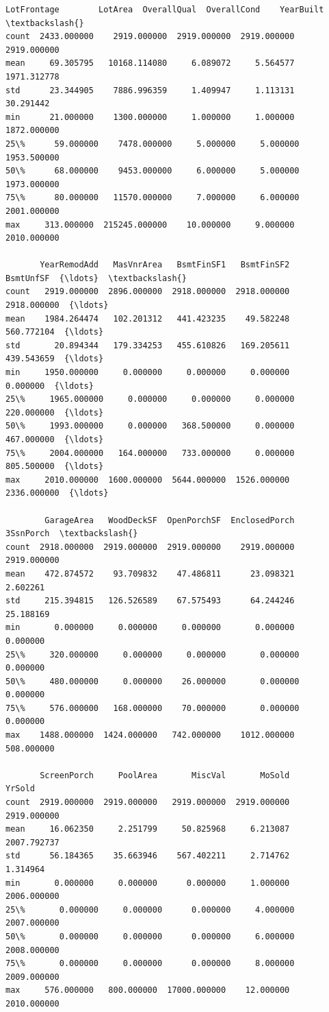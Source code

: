 \documentclass[11pt]{article}
\makeatletter
\newcommand{\boxspacing}{\kern\kvtcb@left@rule\kern\kvtcb@boxsep}
\newcommand{\prompt}[4]{
        \ttfamily\llap{{\color{#2}[#3]:\hspace{3pt}#4}}\vspace{-\baselineskip}
    }
\makeatother
\begin{document}
            \begin{tcolorbox}[breakable, size=fbox, boxrule=.5pt, pad at break*=1mm, opacityfill=0]
\prompt{Out}{outcolor}{349}{\boxspacing}
\begin{Verbatim}[commandchars=\\\{\}]
       LotFrontage        LotArea  OverallQual  OverallCond    YearBuilt  \textbackslash{}
count  2433.000000    2919.000000  2919.000000  2919.000000  2919.000000
mean     69.305795   10168.114080     6.089072     5.564577  1971.312778
std      23.344905    7886.996359     1.409947     1.113131    30.291442
min      21.000000    1300.000000     1.000000     1.000000  1872.000000
25\%      59.000000    7478.000000     5.000000     5.000000  1953.500000
50\%      68.000000    9453.000000     6.000000     5.000000  1973.000000
75\%      80.000000   11570.000000     7.000000     6.000000  2001.000000
max     313.000000  215245.000000    10.000000     9.000000  2010.000000

       YearRemodAdd   MasVnrArea   BsmtFinSF1   BsmtFinSF2    BsmtUnfSF  {\ldots}  \textbackslash{}
count   2919.000000  2896.000000  2918.000000  2918.000000  2918.000000  {\ldots}
mean    1984.264474   102.201312   441.423235    49.582248   560.772104  {\ldots}
std       20.894344   179.334253   455.610826   169.205611   439.543659  {\ldots}
min     1950.000000     0.000000     0.000000     0.000000     0.000000  {\ldots}
25\%     1965.000000     0.000000     0.000000     0.000000   220.000000  {\ldots}
50\%     1993.000000     0.000000   368.500000     0.000000   467.000000  {\ldots}
75\%     2004.000000   164.000000   733.000000     0.000000   805.500000  {\ldots}
max     2010.000000  1600.000000  5644.000000  1526.000000  2336.000000  {\ldots}

        GarageArea   WoodDeckSF  OpenPorchSF  EnclosedPorch    3SsnPorch  \textbackslash{}
count  2918.000000  2919.000000  2919.000000    2919.000000  2919.000000
mean    472.874572    93.709832    47.486811      23.098321     2.602261
std     215.394815   126.526589    67.575493      64.244246    25.188169
min       0.000000     0.000000     0.000000       0.000000     0.000000
25\%     320.000000     0.000000     0.000000       0.000000     0.000000
50\%     480.000000     0.000000    26.000000       0.000000     0.000000
75\%     576.000000   168.000000    70.000000       0.000000     0.000000
max    1488.000000  1424.000000   742.000000    1012.000000   508.000000

       ScreenPorch     PoolArea       MiscVal       MoSold       YrSold
count  2919.000000  2919.000000   2919.000000  2919.000000  2919.000000
mean     16.062350     2.251799     50.825968     6.213087  2007.792737
std      56.184365    35.663946    567.402211     2.714762     1.314964
min       0.000000     0.000000      0.000000     1.000000  2006.000000
25\%       0.000000     0.000000      0.000000     4.000000  2007.000000
50\%       0.000000     0.000000      0.000000     6.000000  2008.000000
75\%       0.000000     0.000000      0.000000     8.000000  2009.000000
max     576.000000   800.000000  17000.000000    12.000000  2010.000000


\end{Verbatim}
\end{tcolorbox}
\end{document}
